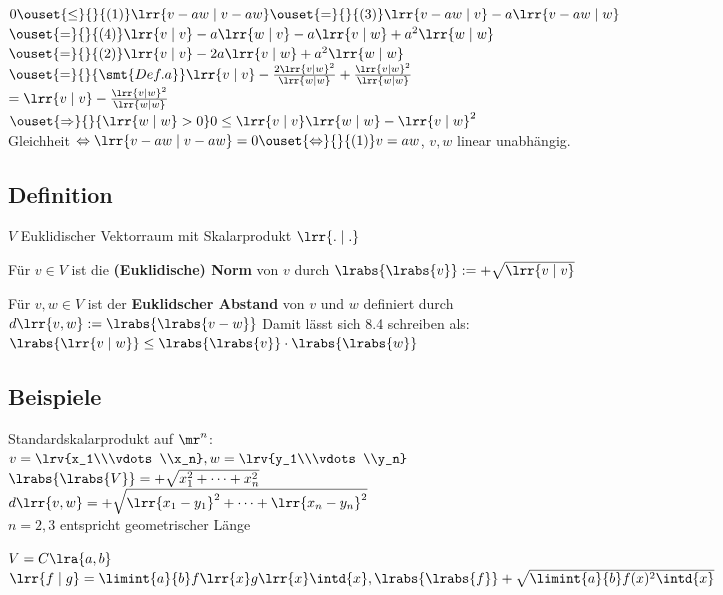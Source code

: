 	$0\ouset{\leq}{}{(1)}\lrr{v-aw\mid v-aw}\ouset{=}{}{(3)}\lrr{v-aw\mid v}-a\lrr{v-aw\mid w}$\\
	$\ouset{=}{}{(4)}\lrr{v\mid v}-a\lrr{w\mid v}-a\lrr{v\mid w}+a^2\lrr{w\mid w}$\\
	$\ouset{=}{}{(2)}\lrr{v\mid v}-2a\lrr{v\mid w}+a^2\lrr{w\mid w}$\\
	$\ouset{=}{}{\smt{Def. a}}\lrr{v\mid v}-\frac{2\lrr{v\mid w}^2}{\lrr{w\mid w}}+\frac{\lrr{v\mid w}^2}{\lrr{w\mid w}}$\\
	$=\lrr{v\mid v}-\frac{\lrr{v\mid w}^2}{\lrr{w\mid w}}$\\
	$\ouset{\Rightarrow}{}{\lrr{w\mid w}>0} 0\leq\lrr{v\mid v}\lrr{w\mid w}-\lrr{v\mid w}^2$\\
	Gleichheit $\Leftrightarrow\lrr{v-aw\mid v-aw}=0\ouset{\Leftrightarrow}{}{(1)}v=aw$, $v,w$ linear unabhängig.
	
\subsection{Definition}
	$V$ Euklidischer Vektorraum mit Skalarprodukt $\lrr{.\mid .}$
		\item Für $v\in V$ ist die \textbf{(Euklidische) Norm} von $v$ durch $\lrabs{\lrabs{v}}:=+\sqrt{\lrr{v\mid v}}$
		\item Für $v,w\in V$ ist der \textbf{Euklidscher Abstand} von $v$ und $w$ definiert durch\\
			$d\lrr{v,w}:=\lrabs{\lrabs{v-w}}$
	\subExEnd
	Damit lässt sich 8.4 schreiben als: $\lrabs{\lrr{v\mid w}}\leq\lrabs{\lrabs{v}}\cdot\lrabs{\lrabs{w}}$
	
\subsection{Beispiele}
		\item Standardskalarprodukt auf $\mr^n$:\\
			$v=\lrv{x_1\\\vdots\\x_n}, w=\lrv{y_1\\\vdots\\y_n}$\\
			$\lrabs{\lrabs{V}}=+\sqrt{x_1^2+\dots+x_n^2}$\\
			$d\lrr{v,w}=+\sqrt{\lrr{x_1-y_1}^2+\dots+\lrr{x_n-y_n}^2}$\\
			$n=2,3$ entspricht geometrischer Länge
		\item $V=C\lra{a,b}$\\
			$\lrr{f\mid g}=\limint{a}{b}f\lrr{x}g\lrr{x}\intd{x}, \lrabs{\lrabs{f}}+\sqrt{\limint{a}{b}f(x)^2\intd{x}}$
	\subExEnd
	
